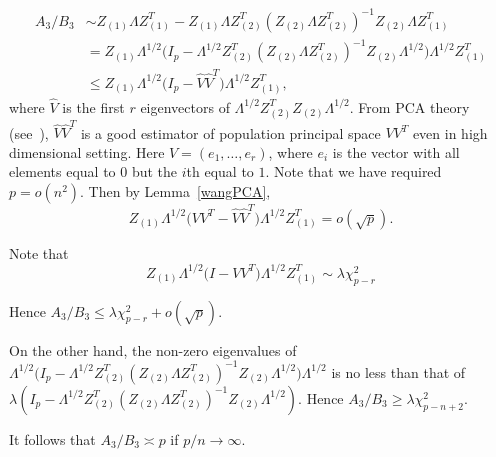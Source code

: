 \documentclass[review]{elsarticle}
\theoremstyle{plain}
\theoremstyle{definition}
\theoremstyle{remark}
\begin{document}
\begin{equation*}
    \begin{aligned}
        A_3/B_3&\sim Z_{(1)}\Lambda Z_{(1)}^T-Z_{(1)}\Lambda Z_{(2)}^T{(Z_{(2)}\Lambda Z_{(2)}^T)}^{-1}Z_{(2)}\Lambda Z_{(1)}^T\\
        &=Z_{(1)}\Lambda^{1/2}\big(I_p -\Lambda^{1/2} Z_{(2)}^T{(Z_{(2)}\Lambda Z_{(2)}^T)}^{-1}Z_{(2)}\Lambda^{1/2} \big)\Lambda^{1/2}Z_{(1)}^T\\
        &\leq Z_{(1)}\Lambda^{1/2}\big(I_p -\hat{V}\hat{V}^T\big)\Lambda^{1/2}Z_{(1)}^T,
    \end{aligned}
\end{equation*}
where $\hat{V}$ is the first $r$ eigenvectors of $\Lambda^{1/2}Z_{(2)}^T Z_{(2)}\Lambda^{1/2}$. From PCA theory (see~\cite{Cai2012Sparse}), $\hat{V}\hat{V}^T$ is a good estimator of population principal space $VV^T$ even in high dimensional setting. Here 
 $V=(e_1,\ldots, e_r)$, where $e_i$ is the vector with all elements equal to $0$ but the $i$th equal to $1$. Note that we have required $p=o(n^2)$. Then by Lemma~\ref{wangPCA},
\begin{equation*}
    Z_{(1)}\Lambda^{1/2}\big(VV^T -\hat{V}\hat{V}^T\big)\Lambda^{1/2}Z_{(1)}^T=o(\sqrt{p}).
\end{equation*}

Note that
\begin{equation*}
    Z_{(1)}\Lambda^{1/2}\big (I-VV^T) \Lambda^{1/2}Z_{(1)}^T\sim\lambda \chi^2_{p-r}
\end{equation*}

Hence $A_3/B_3\leq \lambda\chi^2_{p-r}+o(\sqrt{p})$.

On the other hand, the non-zero eigenvalues of $\Lambda^{1/2}\big(I_p -\Lambda^{1/2} Z_{(2)}^T{(Z_{(2)}\Lambda Z_{(2)}^T)}^{-1}Z_{(2)}\Lambda^{1/2} \big)\Lambda^{1/2}$ is no less than that of $\lambda(I_p -\Lambda^{1/2} Z_{(2)}^T{(Z_{(2)}\Lambda Z_{(2)}^T)}^{-1}Z_{(2)}\Lambda^{1/2})$.
Hence $A_3/B_3\geq \lambda \chi^2_{p-n+2}$.

It follows that $A_3/B_3\asymp p$ if $p/n\to \infty$.


\end{document}
